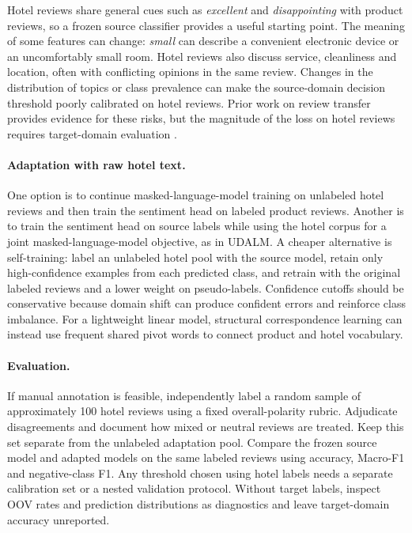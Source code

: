 Hotel reviews share general cues such as \emph{excellent} and \emph{disappointing}
with product reviews, so a frozen source classifier provides a useful starting
point. The meaning of some features can change: \emph{small} can describe a
convenient electronic device or an uncomfortably small room. Hotel reviews also
discuss service, cleanliness and location, often with conflicting opinions in
the same review. Changes in the distribution of topics or class prevalence can
make the source-domain decision threshold poorly calibrated on hotel reviews.
Prior work on review transfer provides evidence for these risks, but the
magnitude of the loss on hotel reviews requires target-domain evaluation
\cite{blitzer2007biographies,karouzos2021udalm}.

\paragraph{Adaptation with raw hotel text.}
One option is to continue masked-language-model training on unlabeled hotel
reviews and then train the sentiment head on labeled product reviews. Another
is to train the sentiment head on source labels while using the hotel corpus
for a joint masked-language-model objective, as in UDALM\cite{karouzos2021udalm}.
A cheaper alternative is self-training: label an unlabeled hotel pool with the
source model, retain only high-confidence examples from each predicted class,
and retrain with the original labeled reviews and a lower weight on pseudo-labels.
Confidence cutoffs should be conservative because domain shift can produce
confident errors and reinforce class imbalance. For a lightweight linear
model, structural correspondence learning can instead use frequent shared
pivot words to connect product and hotel vocabulary\cite{blitzer2007biographies}.

\paragraph{Evaluation.}
If manual annotation is feasible, independently label a random sample of
approximately 100 hotel reviews using a fixed overall-polarity rubric.
Adjudicate disagreements and document how mixed or neutral reviews are treated.
Keep this set separate from the unlabeled adaptation pool. Compare the frozen
source model and adapted models on the same labeled reviews using accuracy,
Macro-F1 and negative-class F1. Any threshold chosen using hotel labels needs
a separate calibration set or a nested validation protocol. Without target
labels, inspect OOV rates and prediction distributions as diagnostics and
leave target-domain accuracy unreported.
